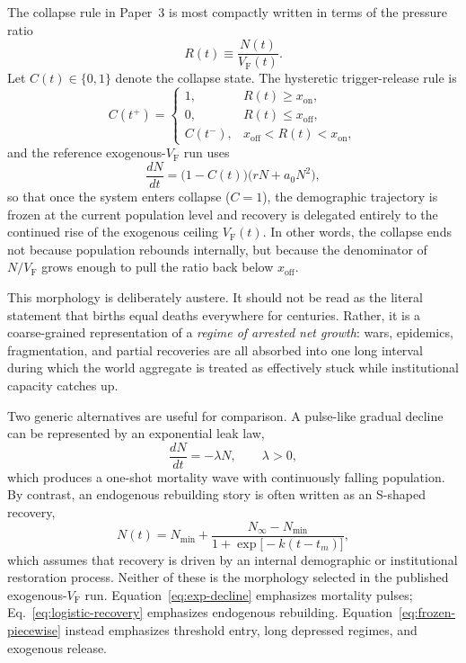 \documentclass[11pt]{article}
\newcommand{\VF}{V_{\mathrm{F}}}
\newcommand{\xon}{x_{\mathrm{on}}}
\newcommand{\xoff}{x_{\mathrm{off}}}
\begin{document}
The collapse rule in Paper~3 is most compactly written in terms of the pressure ratio
\begin{equation}
R(t) \equiv \frac{N(t)}{\VF(t)}.
\end{equation}
Let $C(t)\in\{0,1\}$ denote the collapse state. The hysteretic trigger-release rule is
\begin{equation}
C(t^+) =\begin{cases}1, & R(t)\ge \xon,\\0, & R(t)\le \xoff,\\C(t^-), & \xoff < R(t) < \xon,\end{cases}
\label{eq:hysteresis}
\end{equation}
and the reference exogenous-$\VF$ run uses
\begin{equation}
\frac{dN}{dt} = \bigl(1-C(t)\bigr)\bigl(rN + a_0N^2\bigr),
\label{eq:frozen-piecewise}
\end{equation}
so that once the system enters collapse ($C=1$), the demographic trajectory is frozen at the current population level and recovery is delegated entirely to the continued rise of the exogenous ceiling $\VF(t)$. In other words, the collapse ends not because population rebounds internally, but because the denominator of $N/\VF$ grows enough to pull the ratio back below $\xoff$.

This morphology is deliberately austere. It should not be read as the literal statement that births equal deaths everywhere for centuries. Rather, it is a coarse-grained representation of a \emph{regime of arrested net growth}: wars, epidemics, fragmentation, and partial recoveries are all absorbed into one long interval during which the world aggregate is treated as effectively stuck while institutional capacity catches up.

Two generic alternatives are useful for comparison. A pulse-like gradual decline can be represented by an exponential leak law,
\begin{equation}
\frac{dN}{dt} = -\lambda N, \qquad \lambda >0,
\label{eq:exp-decline}
\end{equation}
which produces a one-shot mortality wave with continuously falling population. By contrast, an endogenous rebuilding story is often written as an S-shaped recovery,
\begin{equation}
N(t) = N_{\min} + \frac{N_{\infty}-N_{\min}}{1+\exp\bigl[-k(t-t_m)\bigr]},
\label{eq:logistic-recovery}
\end{equation}
which assumes that recovery is driven by an internal demographic or institutional restoration process. Neither of these is the morphology selected in the published exogenous-$\VF$ run. Equation~\eqref{eq:exp-decline} emphasizes mortality pulses; Eq.~\eqref{eq:logistic-recovery} emphasizes endogenous rebuilding. Equation~\eqref{eq:frozen-piecewise} instead emphasizes threshold entry, long depressed regimes, and exogenous release.
\end{document}

